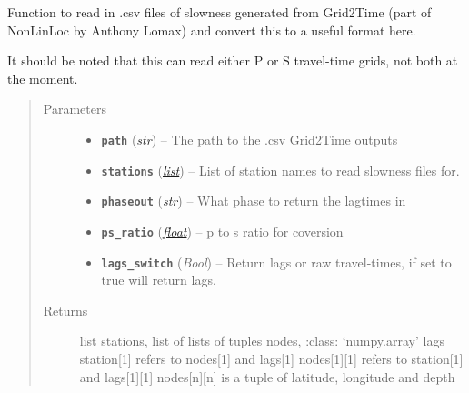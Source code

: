 \documentclass[a4paper,10pt,english]{sphinxmanual}
\begin{document}

\begin{fulllineitems}
\label{core:bright_lights._read_tt}
Function to read in .csv files of slowness generated from Grid2Time (part
of NonLinLoc by Anthony Lomax) and convert this to a useful format here.

It should be noted that this can read either P or S travel-time grids, not
both at the moment.
\begin{quote}\begin{description}
\item[{Parameters}] \leavevmode\begin{itemize}
\item {} 
\textbf{\texttt{path}} (\href{https://docs.python.org/library/functions.html\#str}{\emph{str}}) -- The path to the .csv Grid2Time outputs

\item {} 
\textbf{\texttt{stations}} (\href{https://docs.python.org/library/functions.html\#list}{\emph{list}}) -- List of station names to read slowness files for.

\item {} 
\textbf{\texttt{phaseout}} (\href{https://docs.python.org/library/functions.html\#str}{\emph{str}}) -- What phase to return the lagtimes in

\item {} 
\textbf{\texttt{ps\_ratio}} (\href{https://docs.python.org/library/functions.html\#float}{\emph{float}}) -- p to s ratio for coversion

\item {} 
\textbf{\texttt{lags\_switch}} (\emph{Bool}) -- Return lags or raw travel-times, if set to true will return lags.

\end{itemize}

\item[{Returns}] \leavevmode
list stations, list of lists of tuples nodes,     :class: `numpy.array' lags station{[}1{]} refers to nodes{[}1{]} and     lags{[}1{]} nodes{[}1{]}{[}1{]} refers to station{[}1{]} and lags{[}1{]}{[}1{]}    nodes{[}n{]}{[}n{]} is a tuple of latitude, longitude and depth

\end{description}\end{quote}

\end{fulllineitems}
\end{document}
